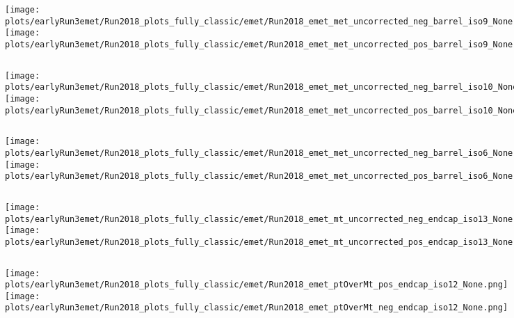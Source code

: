 \documentclass[en,16:9,navbarinfooter]{presentation/sdqbeamer}
\begin{document}
\begin{frame}{\insertsubsection}
   \begin{columns}
   \texttt{[image: plots/earlyRun3emet/Run2018\_plots\_fully\_classic/emet/Run2018\_emet\_met\_uncorrected\_neg\_barrel\_iso9\_None.png]}
   \texttt{[image: plots/earlyRun3emet/Run2018\_plots\_fully\_classic/emet/Run2018\_emet\_met\_uncorrected\_pos\_barrel\_iso9\_None.png]}
\end{columns}
\end{frame}

\begin{frame}{\insertsubsection}
   \begin{columns}
   \texttt{[image: plots/earlyRun3emet/Run2018\_plots\_fully\_classic/emet/Run2018\_emet\_met\_uncorrected\_neg\_barrel\_iso10\_None.png]}
   \texttt{[image: plots/earlyRun3emet/Run2018\_plots\_fully\_classic/emet/Run2018\_emet\_met\_uncorrected\_pos\_barrel\_iso10\_None.png]}
\end{columns}
\end{frame}

\begin{frame}{\insertsubsection}
   \begin{columns}
   \texttt{[image: plots/earlyRun3emet/Run2018\_plots\_fully\_classic/emet/Run2018\_emet\_met\_uncorrected\_neg\_barrel\_iso6\_None.png]}
   \texttt{[image: plots/earlyRun3emet/Run2018\_plots\_fully\_classic/emet/Run2018\_emet\_met\_uncorrected\_pos\_barrel\_iso6\_None.png]}
\end{columns}
\end{frame}

\begin{frame}{\insertsubsection}
   \begin{columns}
   \texttt{[image: plots/earlyRun3emet/Run2018\_plots\_fully\_classic/emet/Run2018\_emet\_mt\_uncorrected\_neg\_endcap\_iso13\_None.png]}
   \texttt{[image: plots/earlyRun3emet/Run2018\_plots\_fully\_classic/emet/Run2018\_emet\_mt\_uncorrected\_pos\_endcap\_iso13\_None.png]}
\end{columns}
\end{frame}

\begin{frame}{\insertsubsection}
   \begin{columns}
   \texttt{[image: plots/earlyRun3emet/Run2018\_plots\_fully\_classic/emet/Run2018\_emet\_ptOverMt\_pos\_endcap\_iso12\_None.png]}
   \texttt{[image: plots/earlyRun3emet/Run2018\_plots\_fully\_classic/emet/Run2018\_emet\_ptOverMt\_neg\_endcap\_iso12\_None.png]}
\end{columns}
\end{frame}
\end{document}
